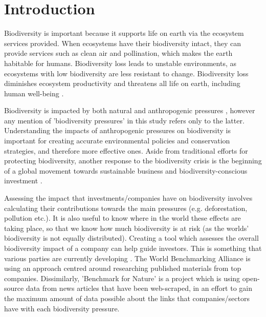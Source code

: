 \documentclass[11pt, a4paper, titlepage]{article}
\begin{document}
	\tableofcontents
	
	\newpage
	
    \section*{Introduction}
    
   	 Biodiversity is important because it supports life on earth via the ecosystem services provided. When ecosystems have their biodiversity intact, they can provide services such as clean air and pollination, which makes the earth habitable for humans. Biodiversity loss leads to unstable environments, as ecosystems with low biodiversity are less resistant to change. Biodiversity loss diminishes ecosystem productivity \citep{duffy2017biodiversity} and threatens all life on earth, including human well-being \citep{diaz2006biodiversity}. \newline
   	 
   	 Biodiversity is impacted by both natural and anthropogenic pressures \citep{nobel2020anthropogenic}, however any mention of 'biodiversity pressures' in this study refers only to the latter. Understanding the impacts of anthropogenic pressures on biodiversity is important for creating accurate environmental policies and conservation strategies, and therefore more effective ones. Aside from traditional efforts for protecting biodiversity, another response to the biodiversity crisis \citep{ogar2020science} is the beginning of a global movement towards sustainable business and biodiversity-conscious investment \citep{pri2020}\citep{worldeconomicforum2020}\citep{wwf2020}. \newline
   	 
   	 Assessing the impact that investments/companies have on biodiversity involves calculating their contributions towards the main pressures (e.g. deforestation, pollution etc.). It is also useful to know where in the world these effects are taking place, so that we know how much biodiversity is at risk (as the worlds' biodiversity is not equally distributed). Creating a tool which assesses the overall biodiversity impact of a company can help guide investors. This is something that various parties are currently developing \citep{worldbenchmarkingalliance_2022}\citep{iccs_2020}. The World Benchmarking Alliance is using an approach centred around researching published materials from top companies. Dissimilarly, 'Benchmark for Nature' is a project which is using open-source data from news articles that have been web-scraped, in an effort to gain the maximum amount of data possible about the links that companies/sectors have with each biodiversity pressure.  \newline
   	 
\end{document}
